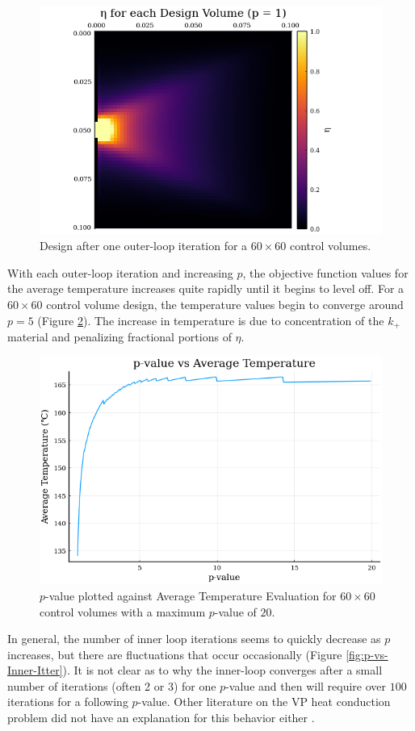 \begin{figure}
	\centering
	\includegraphics[width=0.75\linewidth]{Chapter_III_Implementation_and_Results/Images/60x60_1p.png}
	\caption[One Outer-Loop Iteration]{Design after one outer-loop iteration for a $60\times 60$ control volumes.}
	\label{fig:60x60-p=1}
\end{figure}

With each outer-loop iteration and increasing $p$, the objective function values for the average temperature increases quite rapidly until it begins to level off. For a $60\times 60$ control volume design, the temperature values begin to converge around $p=5$ (Figure \ref{fig:p-vs-T}). The increase in temperature is due to concentration of the $k_+$ material and penalizing fractional portions of $\eta$.

\begin{figure}
	\centering
	\includegraphics[width=0.75\linewidth]{Chapter_III_Implementation_and_Results/Images/60x60-p_vs_T.png}
	\caption[$p$-value vs. $T_{av}$]{$p$-value plotted against Average Temperature Evaluation for $60\times 60$ control volumes with a maximum $p$-value of $20$.}
	\label{fig:p-vs-T}
\end{figure}

In general, the number of inner loop iterations seems to quickly decrease as $p$ increases, but there are fluctuations that occur occasionally (Figure \ref{fig:p-vs-Inner-Itter}). It is not clear as to why the inner-loop converges after a small number of iterations (often 2 or 3) for one $p$-value and then will require over $100$ iterations for a following $p$-value. Other literature on the VP heat conduction problem did not have an explanation for this behavior either \cite{Marck2012}.

